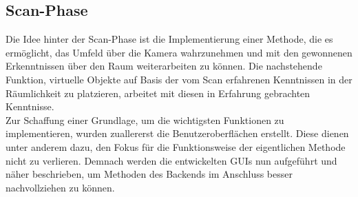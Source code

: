 \subsection{Scan-Phase} %
\label{chap:scan_implementation}
Die Idee hinter der Scan-Phase ist die Implementierung einer Methode, die es ermöglicht, das Umfeld über die Kamera wahrzunehmen und mit den gewonnenen 
Erkenntnissen über den Raum weiterarbeiten zu können. Die nachstehende Funktion, virtuelle Objekte auf Basis der vom Scan erfahrenen Kenntnissen in 
der Räumlichkeit zu platzieren, arbeitet mit diesen in Erfahrung gebrachten Kenntnisse. 
\\ 
Zur Schaffung einer Grundlage, um die wichtigsten Funktionen zu implementieren, wurden zuallererst die Benutzeroberflächen erstellt. Diese dienen 
unter anderem dazu, den Fokus für die Funktionsweise der eigentlichen Methode nicht zu verlieren. Demnach werden die entwickelten \acs{GUI}s nun aufgeführt 
und näher beschrieben, um Methoden des Backends im Anschluss besser nachvollziehen zu können.
